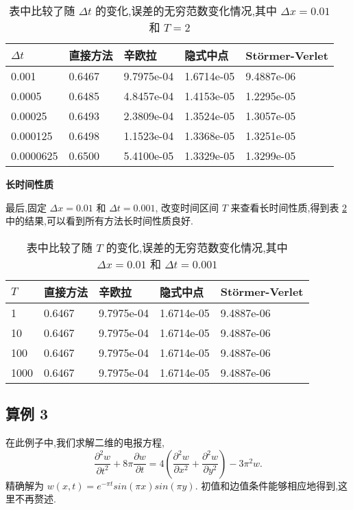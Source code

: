 \begin{table}[h]
  \centering
\caption{表中比较了随 $\Delta t$ 的变化,误差的无穷范数变化情况,其中 $\Delta x=0.01$ 和 $T=2$}
\begin{tabularx}{\linewidth}{XXXXX}
 \toprule[1.5pt]
 $\Delta t$ &直接方法 & 辛欧拉 & 隐式中点 & St\"{o}rmer-Verlet\\
 \midrule[1pt]
 0.001 & 0.6467 & 9.7975e-04 & 1.6714e-05 & 9.4887e-06 \\
 0.0005 & 0.6485 & 4.8457e-04 & 1.4153e-05 & 1.2295e-05 \\
 0.00025 & 0.6493 & 2.3809e-04 & 1.3524e-05 & 1.3057e-05 \\
 0.000125 & 0.6498 & 1.1523e-04 & 1.3368e-05 & 1.3251e-05 \\
 0.0000625 & 0.6500 & 5.4100e-05 & 1.3329e-05 & 1.3299e-05 \\
 \bottomrule[1.5pt]
\end{tabularx}
  \label{tab:dt2}
\end{table}

\textbf{长时间性质}

最后,固定 $\Delta x = 0.01$ 和 $\Delta t = 0.001$, 改变时间区间 $T$ 来查看长时间性质,得到表 \ref{tab:t2} 中的结果,可以看到所有方法长时间性质良好.

\begin{table}[h]
  \centering
\caption{表中比较了随 $T$ 的变化,误差的无穷范数变化情况,其中 $\Delta x=0.01$ 和 $\Delta t=0.001$}
\begin{tabularx}{\linewidth}{XXXXX}
 \toprule[1.5pt]
 $T$ &直接方法 & 辛欧拉 & 隐式中点 & St\"{o}rmer-Verlet\\
 \midrule[1pt]
 1 & 0.6467 & 9.7975e-04 & 1.6714e-05 & 9.4887e-06 \\
 10 & 0.6467 & 9.7975e-04 & 1.6714e-05 & 9.4887e-06 \\
 100 & 0.6467 & 9.7975e-04 & 1.6714e-05 & 9.4887e-06 \\
 1000 & 0.6467 & 9.7975e-04 & 1.6714e-05 & 9.4887e-06 \\
 \bottomrule[1.5pt]
\end{tabularx}
  \label{tab:t2}
\end{table}

\subsection*{算例 3}
在此例子中,我们求解二维的电报方程,
\begin{equation*}
\frac{\partial ^2 w}{\partial t^2}+8\pi \frac{\partial w}{\partial
t}=4 (\frac{\partial ^2 w}{\partial x^2} + \frac{\partial ^2
w}{\partial y^2}) -3\pi^2 w.
\end{equation*}
精确解为 $w(x,t) = e^{-\pi t}sin(\pi x)sin(\pi y)$. 初值和边值条件能够相应地得到,这里不再赘述.

